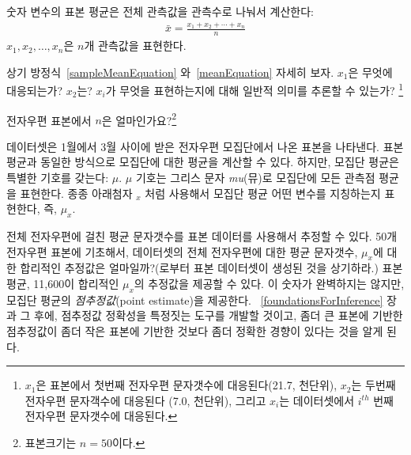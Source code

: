 \begin{termBox}{%
숫자 변수의 표본 평균은 전체 관측값을 관측수로 나눠서 계산한다:
\begin{eqnarray}
\bar{x} = \frac{x_1+x_2+\cdots+x_n}{n}
\label{meanEquation}
\end{eqnarray}
$x_1, x_2, \dots, x_n$은 $n$개 관측값을 표현한다.}
\end{termBox}\vspace{-2mm}

\begin{exercise}

상기 방정식~\eqref{sampleMeanEquation} 와~\eqref{meanEquation} 자세히 보자.
$x_1$은 무엇에 대응되는가? $x_2$는? $x_i$가 무엇을 표현하는지에 대해 일반적 의미를 추론할 수 있는가?
\footnote{$x_1$은 표본에서 첫번째 전자우편 문자갯수에 대응된다(21.7, 천단위),
$x_2$는 두번째 전자우편 문자객수에 대응된다 (7.0, 천단위), 그리고 $x_i$는 데이터셋에서 $i^{th}$ 번째 전자우편 문자갯수에 대응된다.}
\end{exercise}

\begin{exercise}
전자우편 표본에서 $n$은 얼마인가요?\footnote{표본크기는 $n=50$이다.}
\end{exercise}

 데이터셋은 1월에서 3월 사이에 받은 전자우편 모집단에서 나온 표본을 나타낸다.
표본평균과 동일한 방식으로 모집단에 대한 평균을 계산할 수 있다.
하지만, 모집단 평균은 특별한 기호를 갖는다: $\mu$. 
$\mu$ 기호는 그리스 문자 \emph{mu}(뮤)로 모집단에 모든 관측점 평균을 표현한다.
종종 아래첨자 $_x$ 처럼 사용해서 모집단 평균 어떤 변수를 지칭하는지 표현한다, 즉, $\mu_x$.


\begin{example}{
전체 전자우편에 걸친 평균 문자갯수를 표본 데이터를 사용해서 추정할 수 있다.
50개 전자우편 표본에 기초해서,  데이터셋의 전체 전자우편에 대한 평균 문자갯수, $\mu_x$에 대한 합리적인 추정값은 얼마일까?(로부터 표본  데이터셋이 생성된 것을 상기하라.)}
표본 평균, 11,600이 합리적인 $\mu_x$의 추정값을 제공할 수 있다.
이 숫자가 완벽하지는 않지만, 모집단 평균의 \emph{점추정값}(point estimate)을 제공한다.
~\ref{foundationsForInference} 장과 그 후에, 점추정값 정확성을 특정짓는 도구를 개발할 것이고,
좀더 큰 표본에 기반한 점추정값이 좀더 작은 표본에 기반한 것보다 좀더 정확한 경향이 있다는 것을 알게 된다.
\end{example}

